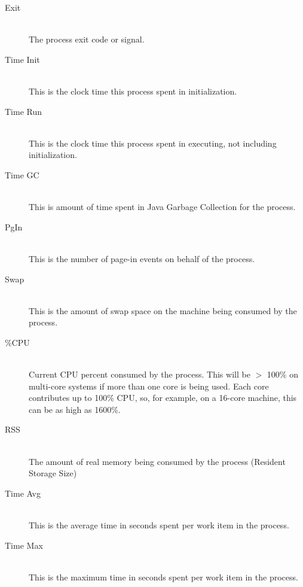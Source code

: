 \begin{description}
          \item[Exit] \hfill \\
            The process exit code or signal.
            
          \item[Time Init] \hfill \\
            This is the clock time this process spent in initialization.
            
          \item[Time Run] \hfill \\
            This is the clock time this process spent in executing, not including
            initialization.
            
          \item[Time GC] \hfill \\
            This is amount of time spent in Java Garbage Collection for the process.
            
          \item[PgIn] \hfill \\
            This is the number of page-in events on behalf of the process.

          \item[Swap] \hfill \\
            This is the amount of swap space on the machine being consumed by the process.

          \item[\%CPU] \hfill \\
            Current CPU percent consumed by the process.  This will be $>$ 100\% on 
            multi-core systems if more than one core is being used.  Each core contributes
            up to 100\% CPU, so, for example, on a 16-core machine, this can be as high
            as 1600\%.
            
          \item[RSS] \hfill \\
            The amount of real memory being consumed by the process (Resident Storage Size)
            
          \item[Time Avg] \hfill \\
            This is the average time in seconds spent per work item in the process.
            
          \item[Time Max] \hfill \\
            This is the maximum time in seconds spent per work item in the process.
            

\end{description}

